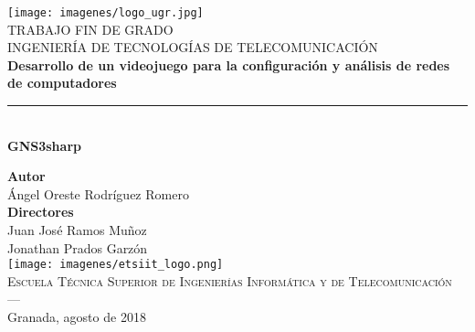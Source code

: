 \begin{titlepage}
 
 
\newlength{\centeroffset}
\setlength{\centeroffset}{-0.5\oddsidemargin}
\addtolength{\centeroffset}{0.5\evensidemargin}
\thispagestyle{empty}

\noindent\hspace*{\centeroffset}\begin{minipage}{\textwidth}

\centering
\texttt{[image: imagenes/logo\_ugr.jpg]}\\[1.4cm]

\textsc{ \Large TRABAJO FIN DE GRADO\\[0.2cm]}
\textsc{INGENIERÍA DE TECNOLOGÍAS DE TELECOMUNICACIÓN}\\[1cm]
% 
{\Large\bfseries Desarrollo de un videojuego para la configuración y análisis de redes de computadores\\
}
\noindent\rule[-1ex]{\textwidth}{3pt}\\[3.5ex]
{\large\bfseries GNS3sharp}
\end{minipage}

\vspace{2.5cm}
\noindent\hspace*{\centeroffset}\begin{minipage}{\textwidth}
\centering

\textbf{Autor}\\ {Ángel Oreste Rodríguez Romero}\\[2.5ex]
\textbf{Directores}\\
{Juan José Ramos Muñoz\\
Jonathan Prados Garzón}\\[2cm]
\texttt{[image: imagenes/etsiit\_logo.png]}\\[0.1cm]
\textsc{Escuela Técnica Superior de Ingenierías Informática y de Telecomunicación}\\
\textsc{---}\\
Granada, agosto de 2018
\end{minipage}
\end{titlepage}


